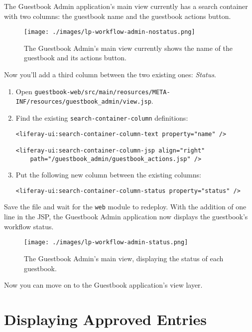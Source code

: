 The Guestbook Admin application's main view currently has a search
container with two columns: the guestbook name and the guestbook actions
button.

\begin{figure}
\centering
\texttt{[image: ./images/lp-workflow-admin-nostatus.png]}
\caption{The Guestbook Admin's main view currently shows the name of the
guestbook and its actions button.}
\end{figure}

Now you'll add a third column between the two existing ones:
\emph{Status}.

\begin{enumerate}
\def\labelenumi{\arabic{enumi}.}
\item
  Open
  \texttt{guestbook-web/src/main/reosurces/META-INF/resources/guestbook\_admin/view.jsp}.
\item
  Find the existing \texttt{search-container-column} definitions:

\begin{verbatim}
<liferay-ui:search-container-column-text property="name" />

<liferay-ui:search-container-column-jsp align="right"
    path="/guestbook_admin/guestbook_actions.jsp" />
\end{verbatim}
\item
  Put the following new column between the existing columns:

\begin{verbatim}
<liferay-ui:search-container-column-status property="status" />
\end{verbatim}
\end{enumerate}

Save the file and wait for the \texttt{web} module to redeploy. With the
addition of one line in the JSP, the Guestbook Admin application now
displays the guestbook's workflow status.

\begin{figure}
\centering
\texttt{[image: ./images/lp-workflow-admin-status.png]}
\caption{The Guestbook Admin's main view, displaying the status of each
guestbook.}
\end{figure}

Now you can move on to the Guestbook application's view layer.

\chapter{Displaying Approved Entries}\label{displaying-approved-entries}

